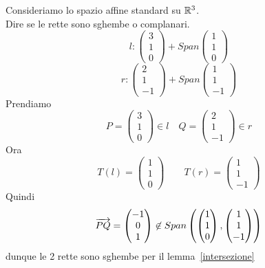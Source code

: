 \newpage
\begin{ese}\bianco
Consideriamo lo spazio affine standard su $\mathbb{R}^3$.\\
Dire se le rette sono sghembe o complanari.
$$ l: \begin{pmatrix} 3\\1\\0  \end{pmatrix} + Span   \begin{pmatrix}  1\\ 1\\0 \end{pmatrix} $$
$$ r: \begin{pmatrix} 2\\1\\-1  \end{pmatrix} + Span   \begin{pmatrix}  1\\ 1\\-1 \end{pmatrix} $$
Prendiamo 
$$ P = \begin{pmatrix}
3\\1\\0 
\end{pmatrix} \in l \quad Q=\begin{pmatrix}
2\\1\\-1
\end{pmatrix} \in r $$
Ora
$$ T(l) = \begin{pmatrix}
1\\1\\0 
\end{pmatrix} \qquad T(r) = \begin{pmatrix}
1 \\ 1\\-1
\end{pmatrix}$$
Quindi 
$$ \overrightarrow{PQ} =\begin{pmatrix}
-1\\0\\1 
\end{pmatrix} \not \in Span \left( \begin{pmatrix}
1\\1\\0
\end{pmatrix} , \begin{pmatrix}
1\\1\\-1
\end{pmatrix} \right)$$
dunque le 2 rette sono sghembe per il lemma~\ref{intersezione}
\end{ese}
\newpage

